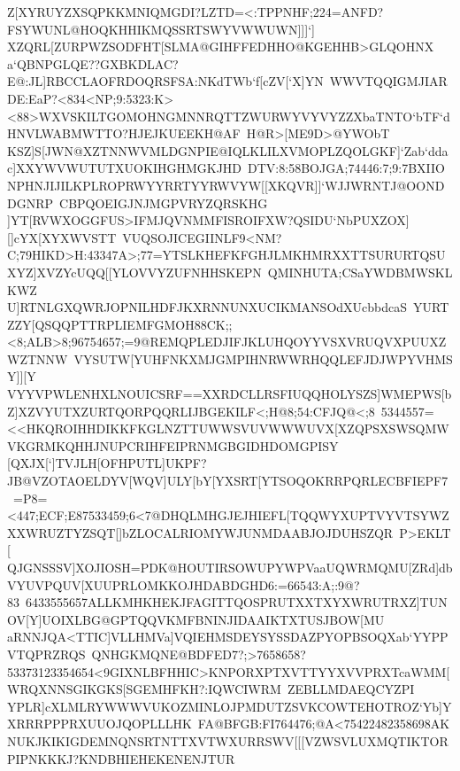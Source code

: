 {{{ Z[XYRUYZXSQPKKMNIQMGDI?LZTD=<:TPPNHF;224=ANFD?FSYWUNL@HOQKHHIKMQSSRTSWYVWWUWN]]]`]%
 XZQRL[ZURPWZSODFHT[SLMA@GIHFFEDHHO@KGEHHB>GLQOHNX}
 \hbox{a`QBNPGLQE??GXBKDLAC?E@:JL]RBCCLAOFRDOQRSFSA:NKdTWb`f[cZV[`X]YN%
 WWVTQQIGMJIARDE:EaP?<834<NP;9:5323:K><88>WXVSKILTGOMOHNGMNNRQTTZWURWYVYVYZZXbaTNTO`bTF`dHNVLWABMWTTO?HJEJKUEEKH@AF%
 H@R>[ME9D>@YWObT}
 \hbox{KSZ]S[JWN@XZTNNWVMLDGNPIE@IQLKLILXVMOPLZQOLGKF]`Zab`ddac]XXYWVWUTUTXUOKIHGHMGKJHD%
 DTV:8:58BOJGA;74446:7;9:7BXIIONPHNJIJILKPLROPRWYYRRTYYRWVYW[[XKQVR]]`WJJWRNTJ@OONDDGNRP%
 CBPQOEIGJNJMGPVRYZQRSKHG}
 \hbox{]YT[RVWXOGGFUS>IFMJQVNMMFISROIFXW?QSIDU`NbPUXZOX][]cYX[XYXWVSTT%
 VUQSOJICEGIINLF9<NM?C;79HIKD>H:43347A>;77=YTSLKHEFKFGHJLMKHMRXXTTSURURTQSUXYZ]XVZYcUQQ[[YLOVVYZUFNHHSKEPN%
 QMINHUTA;CSaYWDBMWSKLKWZ}
 \hbox{U]RTNLGXQWRJOPNILHDFJKXRNNUNXUCIKMANSOdXUcbbdcaS%
 YURTZZY[QSQQPTTRPLIEMFGMOH88CK;;<8;ALB>8;96754657;=9@REMQPLEDJIFJKLUHQOYYVSXVRUQVXPUUXZWZTNNW%
 VYSUTW[YUHFNKXMJGMPIHNRWWRHQQLEFJDJWPYVHMSY]][Y}
 \hbox{VYYVPWLENHXLNOUICSRF==XXRDCLLRSFIUQQHOLYSZS]WMEPWS[bZ]XZVYUTXZURTQORPQQRLIJBGEKILF<;H@8;54:CFJQ@<;8%
 5344557=<<HKQROIHHDIKKFKGLNZTTUWWSVUVWWWUVX[XZQPSXSWSQMWVKGRMKQHHJNUPCRIHFEIPRNMGBGIDHDOMGPISY%
 }
 \hbox{[QXJX[`]TVJLH[OFHPUTL]UKPF?JB@VZOTAOELDYV[WQV]ULY[bY[YXSRT[YTSOQOKRRPQRLECBFIEPF7%
 =P8=<447;ECF;E87533459;6<7@DHQLMHGJEJHIEFL[TQQWYXUPTVYVTSYWZXXWRUZTYZSQT[]bZLOCALRIOMYWJUNMDAABJOJDUHSZQR%
 P>EKLT[}
 \hbox{QJGNSSSV]XOJIOSH=PDK@HOUTIRSOWUPYWPVaaUQWRMQMU[ZRd]dbVYUVPQUV[XUUPRLOMKKOJHDABDGHD6:=66543:A;:9@?83%
 6433555657ALLKMHKHEKJFAGITTQOSPRUTXXTXYXWRUTRXZ]TUNOV[Y]UOIXLBG@GPTQQVKMFBNINJIDAAIKTXTUSJBOW[MU%
 }
 \hbox{aRNNJQA<TTIC]VLLHMVa]VQIEHMSDEYSYSSDAZPYOPBSOQXab`YYPPVTQPRZRQS%
 QNHGKMQNE@BDFED7?;>7658658?53373123354654<9GIXNLBFHHIC>KNPORXPTXVTTYYXVVPRXTcaWMM[WRQXNNSGIKGKS[SGEMHFKH?:IQWCIWRM%
 ZEBLLMDAEQCYZPI}
 \hbox{YPLR]cXLMLRYWWWVUKOZMINLOJPMDUTZSVKCOWTEHOTROZ`Yb]YXRRRPPPRXUUOJQOPLLLHK%
 FA@BFGB:FI764476;@A<75422482358698AKNUKJKIKIGDEMNQNSRTNTTXVTWXURRSWV[[[VZWSVLUXMQTIKTORPIPNKKKJ?KNDBHIEHEKENENJTUR%
}}}
